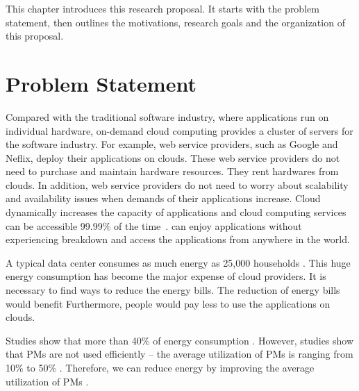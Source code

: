 This chapter introduces this research proposal. It starts with the problem statement, then outlines the motivations, research goals and the organization of this proposal.

\section{Problem Statement}
\label{sec:statement}

 Compared with the traditional software industry, where applications run
on individual hardware, on-demand cloud computing provides a cluster of servers for the software industry. For example, 
web service providers, such as Google and Neflix, deploy their applications on clouds. These web service providers 
do not need to purchase and maintain hardware resources. They rent hardwares from clouds.
In addition, web service providers do not need to worry 
about scalability and availability issues when demands of their applications increase. Cloud dynamically increases the capacity of applications and cloud computing services can be accessible 99.99\% of the time~\cite{adhikari:2012uq}.
 can enjoy applications without experiencing breakdown and access the applications from anywhere in the world.

A typical data center consumes as much energy as 25,000 households \cite{dayarathna:2016ua}. 
This huge energy consumption has become the major expense of cloud providers. It is necessary to find ways to reduce the energy bills. 
The reduction of energy bills would benefit  
Furthermore, people would pay less to use the applications on clouds. 

Studies \cite{Barroso:2007jt, Shen:2015hm} show that  more than 40\% of energy consumption . However, studies show that PMs are not used efficiently -- the average utilization of PMs is ranging from 10\% to 50\% \cite{Hameed:2016cmb}.
Therefore, we can reduce energy by improving the average utilization of PMs .


